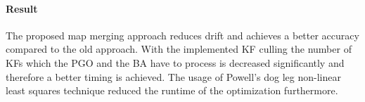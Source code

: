 \paragraph*{Result}
The proposed map merging approach reduces drift and achieves a better accuracy compared to the old approach. With the implemented \ac{KF} culling the number of \acp{KF} which the \ac{PGO} and the \ac{BA} have to process is decreased significantly and therefore a better timing is achieved. The usage of Powell's dog leg non-linear least squares technique reduced the runtime of the optimization furthermore.
